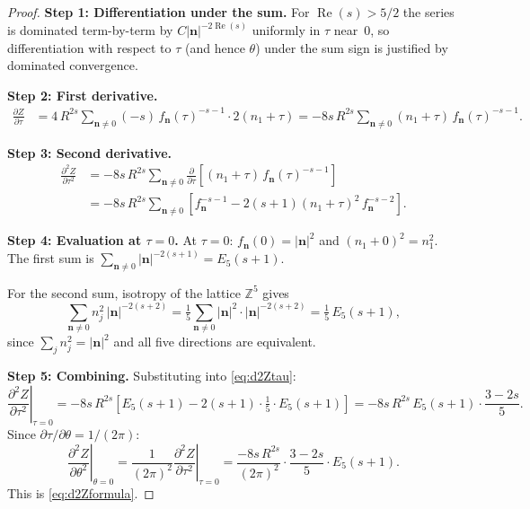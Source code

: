 \begin{proof}
\textbf{Step 1: Differentiation under the sum.}
For $\operatorname{Re}(s)>5/2$ the series is dominated term-by-term by
$C|\mathbf{n}|^{-2\operatorname{Re}(s)}$ uniformly in $\tau$ near~$0$,
so differentiation with respect to $\tau$ (and hence $\theta$)
under the sum sign is justified by dominated convergence.

\textbf{Step 2: First derivative.}
\begin{align}
  \frac{\partial Z}{\partial\tau}
    &= 4\,R^{2s}\sum_{\mathbf{n}\neq 0}(-s)\,f_{\mathbf{n}}(\tau)^{-s-1}
       \cdot 2(n_1+\tau)
     = -8s\,R^{2s}\sum_{\mathbf{n}\neq 0}
       (n_1+\tau)\,f_{\mathbf{n}}(\tau)^{-s-1}.
\end{align}

\textbf{Step 3: Second derivative.}
\begin{align}
  \frac{\partial^2 Z}{\partial\tau^2}
    &= -8s\,R^{2s}\sum_{\mathbf{n}\neq 0}
       \frac{\partial}{\partial\tau}\!\left[
         (n_1+\tau)\,f_{\mathbf{n}}(\tau)^{-s-1}\right]\nonumber\\
    &= -8s\,R^{2s}\sum_{\mathbf{n}\neq 0}\!\left[
       f_{\mathbf{n}}^{-s-1}
       - 2(s+1)(n_1+\tau)^2\,f_{\mathbf{n}}^{-s-2}\right].
       \label{eq:d2Ztau}
\end{align}

\textbf{Step 4: Evaluation at $\tau=0$.}
At $\tau=0$: $f_{\mathbf{n}}(0)=|\mathbf{n}|^2$ and
$(n_1+0)^2=n_1^2$.  The first sum is
$\sum_{\mathbf{n}\neq 0}|\mathbf{n}|^{-2(s+1)}=E_5(s+1)$.

For the second sum, isotropy of the lattice
$\mathbb{Z}^5$ gives
\[
  \sum_{\mathbf{n}\neq 0} n_j^2\,|\mathbf{n}|^{-2(s+2)}
    = \tfrac{1}{5}\sum_{\mathbf{n}\neq 0}|\mathbf{n}|^2
      \cdot|\mathbf{n}|^{-2(s+2)}
    = \tfrac{1}{5}\,E_5(s+1),
\]
since $\sum_j n_j^2=|\mathbf{n}|^2$ and all five directions are
equivalent.

\textbf{Step 5: Combining.}
Substituting into \cref{eq:d2Ztau}:
\[
  \left.\frac{\partial^2 Z}{\partial\tau^2}\right|_{\tau=0}
    = -8s\,R^{2s}\!\left[E_5(s+1)
      - 2(s+1)\cdot\tfrac{1}{5}\cdot E_5(s+1)\right]
    = -8s\,R^{2s}\,E_5(s+1)\cdot\frac{3-2s}{5}.
\]
Since $\partial\tau/\partial\theta=1/(2\pi)$:
\[
  \left.\frac{\partial^2 Z}{\partial\theta^2}\right|_{\theta=0}
    = \frac{1}{(2\pi)^2}
      \left.\frac{\partial^2 Z}{\partial\tau^2}\right|_{\tau=0}
    = \frac{-8s\,R^{2s}}{(2\pi)^2}\cdot\frac{3-2s}{5}\cdot E_5(s+1).
\]
This is \cref{eq:d2Zformula}.
\end{proof}

